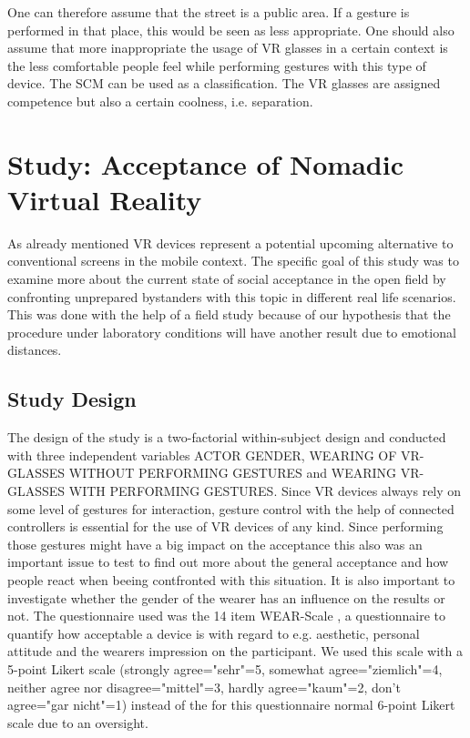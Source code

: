 \documentclass[sigchi]{acmart}
\begin{document}
One can therefore assume that the street is a public area. If a gesture is performed in that place, this would be seen as less appropriate. One should also assume that more inappropriate the usage of VR glasses in a certain context is the less comfortable people feel while performing gestures with this type of device. The SCM can be used as a classification. The VR glasses are assigned competence but also a certain coolness, i.e. separation.


\section{Study: Acceptance of Nomadic Virtual Reality}

As already mentioned VR devices represent a potential upcoming alternative to conventional screens in the mobile context. The specific goal of this study was to examine more about the current state of social acceptance in the open field by confronting unprepared bystanders with this topic in different real life scenarios. This was done with the help of a field study because of our hypothesis that the procedure under laboratory conditions will have another result due to emotional distances.

\subsection{Study Design}

The design of the study is a two-factorial within-subject design and conducted with three independent variables ACTOR GENDER, WEARING OF VR-GLASSES WITHOUT PERFORMING GESTURES and WEARING VR-GLASSES WITH PERFORMING GESTURES. Since VR devices always rely on some level of gestures for interaction, gesture control with the help of connected controllers is essential for the use of VR devices of any kind. Since performing those gestures might have a big impact on the acceptance this also was an important issue to test to find out more about the general acceptance and how people react when beeing contfronted with this situation. It is also important to investigate whether the gender of the wearer has an influence on the results or not.
The questionnaire used was the 14 item WEAR-Scale \cite{kelly2018wearer}, a questionnaire to quantify how acceptable a device is with regard to e.g. aesthetic, personal attitude and the wearers impression on the participant. We used this scale with a 5-point Likert scale (strongly agree="sehr"=5, somewhat agree="ziemlich"=4, neither agree nor disagree="mittel"=3, hardly agree="kaum"=2, don't agree="gar nicht"=1) instead of the for this questionnaire normal 6-point Likert scale due to an oversight.
\end{document}

